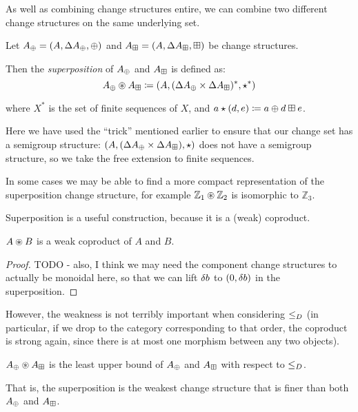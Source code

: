 As well as combining change structures entire, we can combine two different
change structures on the same underlying set.

\begin{defn}[Superposition]
  Let $A_\oplus = (A,\Delta A_\oplus,\oplus)$ and $A_\boxplus =
  (A,\Delta A_\boxplus,\boxplus)$ be change structures.

  Then the \textit{superposition} of $A_\oplus$ and $A_\boxplus$ is defined as:
  $$A_\oplus \circledast A_\boxplus \coloneqq (A,
    (\Delta A_\oplus \times \Delta A_\boxplus)^\ast,\star^\ast)$$

  where $X^\ast$ is the set of finite sequences of $X$, and $a \star (d, e)
  \coloneqq a \oplus d \boxplus e$.
\end{defn}

Here we have used the ``trick'' mentioned earlier to ensure that our change
set has a semigroup structure: $(A,(\Delta A_\oplus \times
  \Delta A_\boxplus),\star)$ does not have a semigroup structure, so we take
the free extension to finite sequences.

In some cases we may be able to find a more compact representation of the
superposition change structure, for example $\mathbb{Z}_1 \circledast \mathbb{Z}_2$ is isomorphic to $\mathbb{Z}_3$.

Superposition is a useful construction, because it is a (weak) coproduct.

\begin{prop}
  $A \circledast B$ is a weak coproduct of $A$ and $B$.
\end{prop}
\begin{proof}
  TODO - also, I think we may need the component change structures to actually
  be monoidal here, so that we can lift $\delta b$ to $(0, \delta b)$ in
  the superposition.
\end{proof}

However, the weakness is not terribly important when considering $\leq_D$
(in particular, if we drop to the category corresponding to that order, the
coproduct is strong again, since there is at most one morphism between any two
objects). 

\begin{corollary}
  $A_\oplus \circledast A_\boxplus$ is the least upper bound of $A_\oplus$ and $A_\boxplus$ with respect to $\leq_D$.
\end{corollary}

That is, the superposition is the weakest change structure that is finer than both
$A_\oplus$ and $A_\boxplus$.

